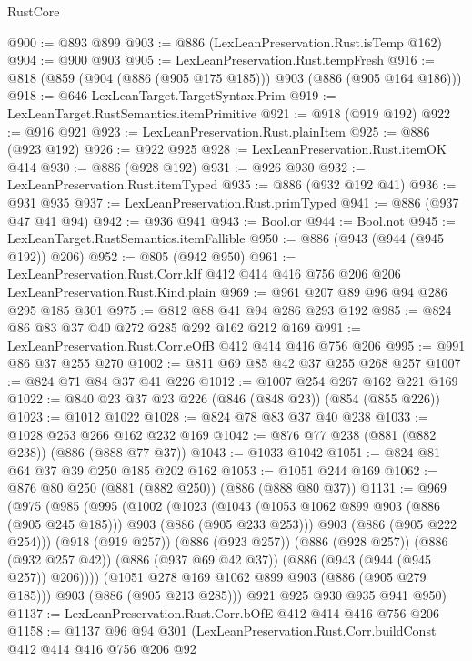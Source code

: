 \begin{lexlean}{RustCore}
\begin{coremodule}
@900 := @893 @899
@903 := @886 (LexLeanPreservation.Rust.isTemp @162)
@904 := @900 @903
@905 := LexLeanPreservation.Rust.tempFresh
@916 := @818 (@859 (@904 (@886 (@905 @175 @185))) @903 (@886 (@905 @164 @186)))
@918 := @646 LexLeanTarget.TargetSyntax.Prim
@919 := LexLeanTarget.RustSemantics.itemPrimitive
@921 := @918 (@919 @192)
@922 := @916 @921
@923 := LexLeanPreservation.Rust.plainItem
@925 := @886 (@923 @192)
@926 := @922 @925
@928 := LexLeanPreservation.Rust.itemOK @414
@930 := @886 (@928 @192)
@931 := @926 @930
@932 := LexLeanPreservation.Rust.itemTyped
@935 := @886 (@932 @192 @41)
@936 := @931 @935
@937 := LexLeanPreservation.Rust.primTyped
@941 := @886 (@937 @47 @41 @94)
@942 := @936 @941
@943 := Bool.or
@944 := Bool.not
@945 := LexLeanTarget.RustSemantics.itemFallible
@950 := @886 (@943 (@944 (@945 @192)) @206)
@952 := @805 (@942 @950)
@961 := LexLeanPreservation.Rust.Corr.kIf
    @412
    @414
    @416
    @756
    @206
    @206
    LexLeanPreservation.Rust.Kind.plain
@969 := @961 @207 @89 @96 @94 @286 @295 @185 @301
@975 := @812 @88 @41 @94 @286 @293 @192
@985 := @824 @86 @83 @37 @40 @272 @285 @292 @162 @212 @169
@991 := LexLeanPreservation.Rust.Corr.eOfB @412 @414 @416 @756 @206
@995 := @991 @86 @37 @255 @270
@1002 := @811 @69 @85 @42 @37 @255 @268 @257
@1007 := @824 @71 @84 @37 @41 @226
@1012 := @1007 @254 @267 @162 @221 @169
@1022 := @840 @23 @37 @23 @226 (@846 (@848 @23)) (@854 (@855 @226))
@1023 := @1012 @1022
@1028 := @824 @78 @83 @37 @40 @238
@1033 := @1028 @253 @266 @162 @232 @169
@1042 := @876 @77 @238 (@881 (@882 @238)) (@886 (@888 @77 @37))
@1043 := @1033 @1042
@1051 := @824 @81 @64 @37 @39 @250 @185 @202 @162
@1053 := @1051 @244 @169
@1062 := @876 @80 @250 (@881 (@882 @250)) (@886 (@888 @80 @37))
@1131 := @969
    (@975
      (@985
        (@995
          (@1002
            (@1023
              (@1043 (@1053 @1062 @899 @903 (@886 (@905 @245 @185))) @903 (@886 (@905 @233 @253)))
              @903
              (@886 (@905 @222 @254)))
            (@918 (@919 @257))
            (@886 (@923 @257))
            (@886 (@928 @257))
            (@886 (@932 @257 @42))
            (@886 (@937 @69 @42 @37))
            (@886 (@943 (@944 (@945 @257)) @206))))
        (@1051 @278 @169 @1062 @899 @903 (@886 (@905 @279 @185)))
        @903
        (@886 (@905 @213 @285)))
      @921
      @925
      @930
      @935
      @941
      @950)
@1137 := LexLeanPreservation.Rust.Corr.bOfE @412 @414 @416 @756 @206
@1158 := @1137
    @96
    @94
    @301
    (LexLeanPreservation.Rust.Corr.buildConst
      @412
      @414
      @416
      @756
      @206
      @92

\end{coremodule}
\end{lexlean}
